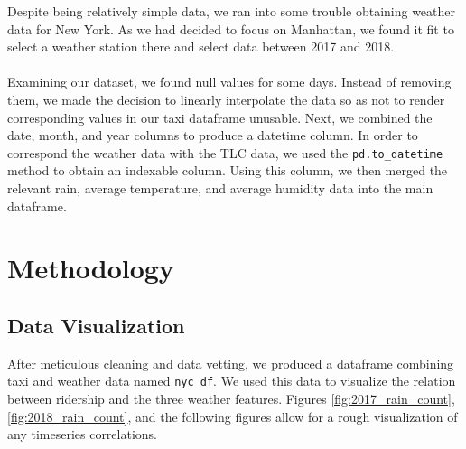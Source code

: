 \documentclass[journal]{IEEEtran}
\newcommand{\cc}[1]{\texttt{#1}}
\begin{document}
\noindent Despite being relatively simple data, we ran into some trouble obtaining weather data for New York. As we had decided to focus on Manhattan, we found it fit to select a weather station there and select data between 2017 and 2018.\\

\\

\noindent Examining our dataset, we found null values for some days. Instead of removing them, we made the decision to linearly interpolate the data so as not to render corresponding values in our taxi dataframe unusable. Next, we combined the date, month, and year columns to produce a datetime column. In order to correspond the weather data with the TLC data, we used the \cc{pd.to\_datetime} method to obtain an indexable column. Using this column, we then merged  the relevant rain, average temperature, and average humidity data into the main dataframe.

\section{Methodology}

\subsection{Data Visualization}

\noindent After meticulous cleaning and data vetting, we produced a dataframe combining taxi and weather data named \cc{nyc\_df}. We used this data to visualize the relation between ridership and the three weather features. Figures \ref{fig:2017_rain_count}, \ref{fig:2018_rain_count}, and the following figures allow for a rough visualization of any timeseries correlations. 
\end{document}

